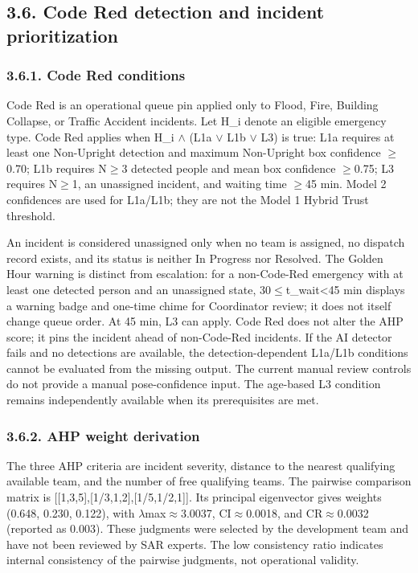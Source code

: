 \documentclass[pdflatex,sn-mathphys-ay]{sn-jnl}
\begin{document}
\subsection*{3.6. Code Red detection and incident prioritization}

\subsubsection*{3.6.1. Code Red conditions}

Code Red is an operational queue pin applied only to Flood, Fire, Building Collapse, or Traffic Accident incidents. Let H\_i denote an eligible emergency type. Code Red applies when H\_i $\wedge$ (L1a $\vee$ L1b $\vee$ L3) is true: L1a requires at least one Non-Upright detection and maximum Non-Upright box confidence $\geq$0.70; L1b requires N$\geq$3 detected people and mean box confidence $\geq$0.75; L3 requires N$\geq$1, an unassigned incident, and waiting time $\geq$45 min. Model 2 confidences are used for L1a/L1b; they are not the Model 1 Hybrid Trust threshold.

An incident is considered unassigned only when no team is assigned, no dispatch record exists, and its status is neither In Progress nor Resolved. The Golden Hour warning is distinct from escalation: for a non-Code-Red emergency with at least one detected person and an unassigned state, 30$\leq$t\_wait\textless{}45 min displays a warning badge and one-time chime for Coordinator review; it does not itself change queue order. At 45 min, L3 can apply. Code Red does not alter the AHP score; it pins the incident ahead of non-Code-Red incidents. If the AI detector fails and no detections are available, the detection-dependent L1a/L1b conditions cannot be evaluated from the missing output. The current manual review controls do not provide a manual pose-confidence input. The age-based L3 condition remains independently available when its prerequisites are met.

\subsubsection*{3.6.2. AHP weight derivation}

The three AHP criteria are incident severity, distance to the nearest qualifying available team, and the number of free qualifying teams. The pairwise comparison matrix is [[1,3,5],[1/3,1,2],[1/5,1/2,1]]. Its principal eigenvector gives weights (0.648, 0.230, 0.122), with $\lambda$max$\approx$3.0037, CI$\approx$0.0018, and CR$\approx$0.0032 (reported as 0.003). These judgments were selected by the development team and have not been reviewed by SAR experts. The low consistency ratio indicates internal consistency of the pairwise judgments, not operational validity.
\end{document}
